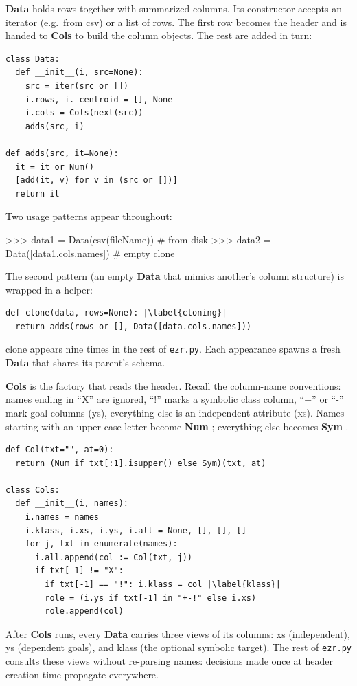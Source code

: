 \documentclass[AMA,STIX2COL]{WileyNJDv5}
\newcommand{\cls}[1]{%
  \setlength{\fboxsep}{1.5pt}%
  \colorbox{clsbg}{\sffamily\bfseries{#1}}%
}
\begin{document}
\cls{Data} holds rows together with summarized columns. Its
constructor accepts an iterator (e.g.\ from \textsf{csv}) or a
list of rows. The first row becomes the header and is handed
to \cls{Cols} to build the column objects. The rest are added
in turn:
\begin{verbatim}
class Data:
  def __init__(i, src=None):
    src = iter(src or [])
    i.rows, i._centroid = [], None
    i.cols = Cols(next(src))
    adds(src, i)

def adds(src, it=None):
  it = it or Num()
  [add(it, v) for v in (src or [])]
  return it
\end{verbatim}
Two usage patterns appear throughout:
\begin{repl}
>>> data1 = Data(csv(fileName))           # from disk
>>> data2 = Data([data1.cols.names])      # empty clone
\end{repl}
The second pattern (an empty \cls{Data} that mimics another's
column structure) is wrapped in a helper:
\begin{verbatim}
def clone(data, rows=None): |\label{cloning}|
  return adds(rows or [], Data([data.cols.names]))
\end{verbatim}
\textsf{clone} appears nine times in the rest of
\texttt{ezr.py}. Each appearance spawns a fresh \cls{Data} that
shares its parent's schema.

\cls{Cols} is the factory that reads the header. Recall the
column-name conventions: names ending in ``X'' are ignored, ``!''
marks a symbolic class column, ``+'' or ``-'' mark goal columns
(\textsf{ys}), everything else is an independent attribute
(\textsf{xs}). Names starting with an upper-case letter become
\cls{Num}; everything else becomes \cls{Sym}.
\begin{verbatim}
def Col(txt="", at=0):
  return (Num if txt[:1].isupper() else Sym)(txt, at)

class Cols:
  def __init__(i, names):
    i.names = names
    i.klass, i.xs, i.ys, i.all = None, [], [], []
    for j, txt in enumerate(names):
      i.all.append(col := Col(txt, j))
      if txt[-1] != "X":
        if txt[-1] == "!": i.klass = col |\label{klass}|
        role = (i.ys if txt[-1] in "+-!" else i.xs)
        role.append(col)
\end{verbatim}
After \cls{Cols} runs, every \cls{Data} carries three views of
its columns: \textsf{xs} (independent), \textsf{ys} (dependent
goals), and \textsf{klass} (the optional symbolic target). The
rest of \texttt{ezr.py} consults these views without re-parsing
names: decisions made once at header creation time propagate
everywhere.
\end{document}
